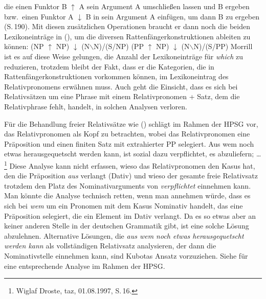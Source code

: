 die einen Funktor B $\uparrow$ A sein Argument A umschließen lassen und B ergeben bzw.\ einen Funktor A $\downarrow$
B in sein Argument A einfügen, um dann B zu ergeben (S.\,190). Mit diesen zusätzlichen Operationen
braucht er dann noch die beiden Lexikoneinträge in (), um die diversen
Rattenfängerkonstruktionen ableiten zu können:
\eal
\ex (NP $\uparrow$ NP) $\downarrow$ (N$\backslash$N)/(S/NP)
\ex (PP $\uparrow$ NP) $\downarrow$ (N$\backslash$N)/(S/PP)
\zl
Morrill ist es auf diese Weise gelungen, die Anzahl der Lexikoneinträge für \emph{which} zu
reduzieren, trotzdem bleibt der Fakt, dass er die Kategorien, die in Rattenfängerkonstruktionen
vorkommen können, im Lexikoneintrag des Relativpronomens erwähnen muss. 
Auch geht die Einsicht, dass es sich bei Relativsätzen um eine Phrase mit einem Relativpronomen
+ Satz, dem die Relativphrase fehlt, handelt, in solchen Analysen verloren.

Für die Behandlung freier Relativsätze wie () schlägt \citet[, 164]{Kubota2003a-u} im
Rahmen der HPSG vor, das Relativpronomen als Kopf zu betrachten, wobei das Relativpronomen eine Präposition und einen finiten
Satz mit extrahierter PP selegiert.
\ea
Aus wem noch etwas herausgequetscht werden kann, ist sozial dazu verpflichtet, es abzuliefern; \ldots\footnote{
        Wiglaf Droste, taz, 01.08.1997, S.\,16.
      }
\z
Diese Analyse kann nicht erfassen, wieso das Relativpronomen den Kasus hat, den die Präposition
\emph{aus} verlangt (Dativ) und wieso der gesamte freie Relativsatz trotzdem den Platz des
Nominativarguments von \emph{verpflichtet} einnehmen kann. Man könnte die Analyse technisch retten,
wenn man annehmen würde, dass es sich bei \emph{wem} um ein Pronomen mit dem Kasus Nominativ handelt,
das eine Präposition selegiert, die ein Element im Dativ verlangt. Da es so etwas aber an keiner
anderen Stelle in der deutschen Grammatik gibt, ist eine solche Lösung abzulehnen. Alternative
Lösungen, die \emph{aus wem noch etwas herausgequetscht werden kann} als vollständigen Relativsatz
analysieren, der dann die Nominativstelle einnehmen kann, sind Kubotas Ansatz vorzuziehen. Siehe
 für eine entsprechende Analyse im Rahmen der HPSG.%


